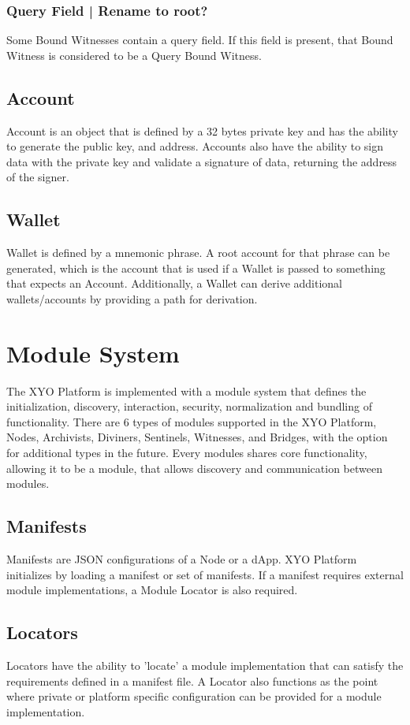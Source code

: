 \documentclass{article}
\begin{document}
\subsubsection{Query Field | Rename to root?}
Some Bound Witnesses contain a query field.  If this field is present, that Bound Witness is considered to be a Query Bound Witness.  

\subsection{Account}
Account is an object that is defined by a 32 bytes private key and has the ability to generate the public key, and address.  Accounts also have the ability to sign data with the private key and validate a signature of data, returning the address of the signer.
\subsection{Wallet}
Wallet is defined by a mnemonic phrase.  A root account for that phrase can be generated, which is the account that is used if a Wallet is passed to something that expects an Account.  Additionally, a Wallet can derive additional wallets/accounts by providing a path for derivation. 

\clearpage

\section{Module System}
The XYO Platform is implemented with a module system that defines the initialization, discovery, interaction, security, normalization and bundling of functionality.  There are 6 types of modules supported in the XYO Platform, Nodes, Archivists, Diviners, Sentinels, Witnesses, and Bridges, with the option for additional types in the future. Every modules shares core functionality, allowing it to be a module, that allows discovery and communication between modules.

\subsection{Manifests}
Manifests are JSON configurations of a Node or a dApp.
XYO Platform initializes by loading a manifest or set of manifests.  If a manifest requires external module implementations, a Module Locator is also required.

\subsection{Locators}
Locators have the ability to 'locate' a module implementation that can satisfy the requirements defined in a manifest file.  A Locator also functions as the point where private or platform specific configuration can be provided for a module implementation.
\end{document}
